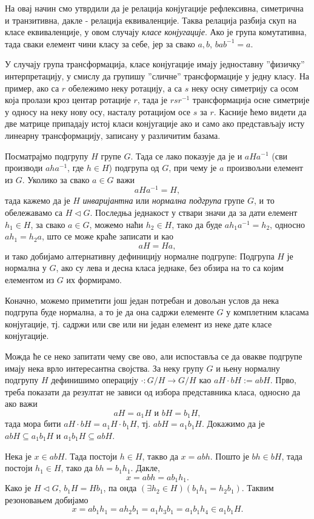 \documentclass{report}
\theoremstyle{plain}
\theoremstyle{definition}
\begin{document}
На овај начин смо утврдили да је релација конјугације рефлексивна, симетрична и транзитивна, дакле - релација еквиваленције. Таква релација разбија скуп на класе еквиваленције, у овом случају \emph{класе конјугације}. Ако је група комутативна, тада сваки елемент чини класу за себе, јер за свако $a, b$, $bab^{-1} = a$.

У случају група трансформација, класе конјугације имају једноставну ''физичку'' интерпретацију, у смислу да групишу ''сличне'' трансформације у једну класу. На пример, ако са $r$ обележимо неку ротацију, а са $s$ неку осну симетрију са осом која пролази кроз центар ротације $r$, тада је $r s r^{-1}$ трансформација осне симетрије у односу на неку нову осу, насталу ротацијом осе $s$ за $r$. Касније ћемо видети да две матрице припадају истој класи конјугације ако и само ако представљају исту линеарну трансформацију, записану у различитим базама.

Посматрајмо подгрупу $H$ групе $G$. Тада се лако показује да је и $aHa^{-1}$ (сви производи $aha^{-1}$, где $h\in H$) подгрупа од $G$, при чему је $a$ произвољни елемент из $G$. Уколико за свако $a\in G$ важи
$$aHa^{-1} = H,$$
тада кажемо да је $H$ \emph{инваријантна} или \emph{нормална подгрупа} групе $G$, и то обележавамо са $H\lhd G$. Последња једнакост у ствари значи да за дати елемент $h_1\in H$, за свако $a\in G$, можемо наћи $h_2\in H$, тако да буде $ah_1a^{-1} = h_2$, односно $ah_1 = h_2 a$, што се може краће записати и као
$$aH = Ha, $$
и тако добијамо алтернативну дефиницију нормалне подгрупе: Подгрупа $H$ је нормална у $G$, ако су лева и десна класа једнаке, без обзира на то са којим елементом из $G$ их формирамо.

Коначно, можемо приметити још један потребан и довољан услов да нека подгрупа буде нормална, а то је да она садржи елементе $G$ у комплетним класама конјугације, тј. садржи или све или ни један елемент из неке дате класе конјугације.

Можда ће се неко запитати чему све ово, али испоставља се да овакве подгрупе имају нека врло интересантна својства. За неку групу $G$ и њену нормалну подгрупу $H$ дефинишимо операцију $\cdot: G/H \to G/H$ као $aH\cdot bH := abH$. Прво, треба показати да резултат не зависи од избора представника класа, односно да ако важи
$$aH = a_1 H \text{ и } bH = b_1 H,$$
тада мора бити $aH\cdot bH = a_1 H \cdot b_1 H$, тј. $abH = a_1 b_1 H$. Докажимо да је $abH \subseteq a_1 b_1 H$ и $a_1 b_1 H \subseteq abH$.

Нека је $x\in abH$. Тада постоји $h\in H$, такво да $x=abh$. Пошто је $bh\in bH$, тада постоји $h_1\in H$, тако да $bh = b_1 h_1$. Дакле,
$$x = abh = ab_1 h_1.$$
Како је $H\lhd G$, $b_1 H = Hb_1$, па онда $(\exists h_2\in H)(b_1h_1=h_2b_1)$. Таквим резоновањем добијамо
$$x = ab_1h_1 = ah_2b_1 = a_1h_3b_1 = a_1b_1h_4 \in a_1b_1H.$$
\end{document}
